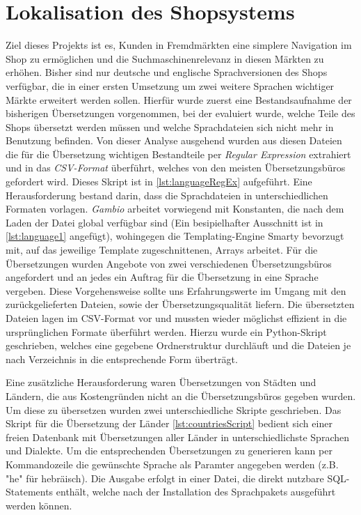 \section{Lokalisation des Shopsystems}
Ziel dieses Projekts ist es, Kunden in Fremdmärkten eine simplere Navigation im Shop zu ermöglichen und die Suchmaschinenrelevanz in diesen Märkten zu erhöhen. 
Bisher sind nur deutsche und englische Sprachversionen des Shops verfügbar, die in einer ersten Umsetzung um zwei weitere Sprachen wichtiger Märkte erweitert werden sollen. 
Hierfür wurde zuerst eine Bestandsaufnahme der bisherigen Übersetzungen vorgenommen, bei der evaluiert wurde, welche Teile des Shops übersetzt werden müssen und welche 
Sprachdateien sich nicht mehr in Benutzung befinden. Von dieser Analyse ausgehend wurden aus diesen Dateien die für die Übersetzung wichtigen Bestandteile 
per \textit{Regular Expression} extrahiert und in das \textit{CSV-Format} überführt, welches von den meisten Übersetzungsbüros gefordert wird. 
Dieses Skript ist in \autoref{lst:languageRegEx} aufgeführt. Eine Herausforderung bestand darin, dass die Sprachdateien in unterschiedlichen Formaten vorlagen. 
\textit{Gambio} arbeitet vorwiegend mit Konstanten, die nach dem Laden der Datei global verfügbar sind (Ein besipielhafter Ausschnitt ist in \autoref{lst:language1} angefügt), 
wohingegen die Templating-Engine Smarty bevorzugt mit, auf das jeweilige Template zugeschnittenen, Arrays arbeitet. 
Für die Übersetzungen wurden Angebote von zwei verschiedenen Übersetzungsbüros angefordert und an jedes ein Auftrag für die Übersetzung in eine Sprache vergeben.
Diese Vorgehensweise sollte uns Erfahrungswerte im Umgang mit den zurückgelieferten Dateien, sowie der Übersetzungsqualität liefern.
Die übersetzten Dateien lagen im CSV-Format vor und mussten wieder möglichst effizient in die ursprünglichen Formate überführt werden.
Hierzu wurde ein Python-Skript geschrieben, welches eine gegebene Ordnerstruktur durchläuft und die Dateien je nach Verzeichnis in die entsprechende Form überträgt.

Eine zusätzliche Herausforderung waren Übersetzungen von Städten und Ländern, die aus Kostengründen nicht an die Übersetzungsbüros gegeben wurden.
Um diese zu übersetzen wurden zwei unterschiedliche Skripte geschrieben. Das Skript für die Übersetzung der Länder \autoref{lst:countriesScript} bedient sich einer freien Datenbank mit Übersetzungen 
aller Länder in unterschiedlichste Sprachen und Dialekte. Um die entsprechenden Übersetzungen zu generieren kann per Kommandozeile die gewünschte Sprache als
Paramter angegeben werden (z.B. "he" für hebräisch). Die Ausgabe erfolgt in einer Datei, die direkt nutzbare SQL-Statements enthält, welche nach der Installation des Sprachpakets 
ausgeführt werden können.

